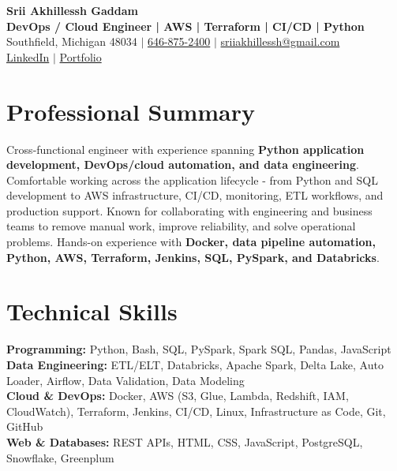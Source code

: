 \documentclass[letterpaper,10pt]{article}
\begin{document}
\fontsize{9.35pt}{10.45pt}\selectfont

\begin{center}
    {\LARGE \textbf{Srii Akhillessh Gaddam}} \\[-1pt]
    \textbf{DevOps / Cloud Engineer | AWS | Terraform | CI/CD | Python} \\[2pt]
    Southfield, Michigan 48034 $|$
    \href{tel:6468752400}{646-875-2400} $|$
    \href{mailto:sriiakhillessh@gmail.com}{sriiakhillessh@gmail.com} \\[1pt]
    \href{https://www.linkedin.com/in/srii-akhiilessh-gaddam-b48668191/}{LinkedIn} $|$
    \href{https://sriiakhillesshg.github.io/portfolio/}{Portfolio}
\end{center}
\vspace{-8pt}

\section{Professional Summary}
\small{Cross-functional engineer with experience spanning \textbf{Python application development, DevOps/cloud automation, and data engineering}. Comfortable working across the application lifecycle - from Python and SQL development to AWS infrastructure, CI/CD, monitoring, ETL workflows, and production support. Known for collaborating with engineering and business teams to remove manual work, improve reliability, and solve operational problems. Hands-on experience with \textbf{Docker, data pipeline automation, Python, AWS, Terraform, Jenkins, SQL, PySpark, and Databricks}.}

\section{Technical Skills}
\small{
\textbf{Programming:} Python, Bash, SQL, PySpark, Spark SQL, Pandas, JavaScript \\
\textbf{Data Engineering:} ETL/ELT, Databricks, Apache Spark, Delta Lake, Auto Loader, Airflow, Data Validation, Data Modeling \\
\textbf{Cloud \& DevOps:} Docker, AWS (S3, Glue, Lambda, Redshift, IAM, CloudWatch), Terraform, Jenkins, CI/CD, Linux, Infrastructure as Code, Git, GitHub \\
\textbf{Web \& Databases:} REST APIs, HTML, CSS, JavaScript, PostgreSQL, Snowflake, Greenplum
}
\end{document}
